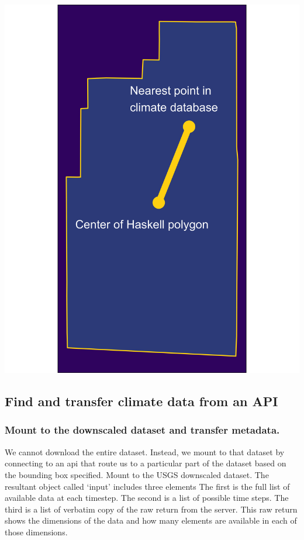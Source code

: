\documentclass[
  paper=a4,
  ,captions=tableheading
]{scrartcl}
\begin{document}
\includegraphics{grid_match.png}

\hypertarget{find-and-transfer-climate-data-from-an-api}{%
\subsection{Find and transfer climate data from an
API}\label{find-and-transfer-climate-data-from-an-api}}

\hypertarget{mount-to-the-downscaled-dataset-and-transfer-metadata.}{%
\subsubsection{Mount to the downscaled dataset and transfer
metadata.}\label{mount-to-the-downscaled-dataset-and-transfer-metadata.}}

We cannot download the entire dataset. Instead, we mount to that dataset
by connecting to an api that route us to a particular part of the
dataset based on the bounding box specified. Mount to the USGS
downscaled dataset. The resultant object called `input' includes three
elements The first is the full list of available data at each timestep.
The second is a list of possible time steps. The third is a list of
verbatim copy of the raw return from the server. This raw return shows
the dimensions of the data and how many elements are available in each
of those dimensions.
\end{document}
